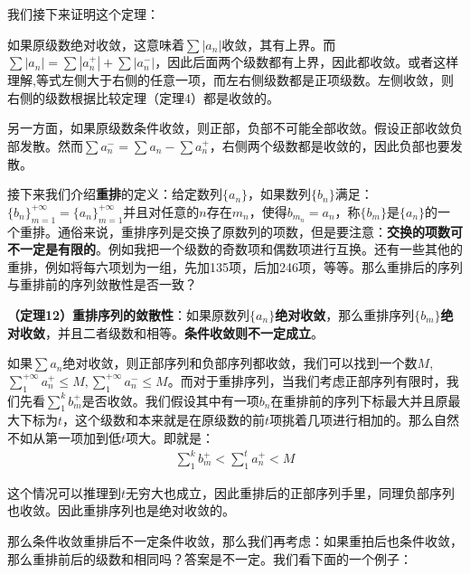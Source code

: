 \documentclass{ctexart}
\let\oldtextbf\textbf
\renewcommand{\textbf}[1]{\textcolor{brown!50!red}{\oldtextbf{#1}}}
\begin{document}
我们接下来证明这个定理：

如果原级数绝对收敛，这意味着$\sum |a_n|$收敛，其有上界。而$\sum |a_n|=\sum |a_n^+|+\sum|a_n^-|$，因此后面两个级数都有上界，因此都收敛。或者这样理解,等式左侧大于右侧的任意一项，而左右侧级数都是正项级数。左侧收敛，则右侧的级数根据比较定理（定理4）都是收敛的。

另一方面，如果原级数条件收敛，则正部，负部不可能全部收敛。假设正部收敛负部发散。然而$\sum a_n^-=\sum a_n-\sum a_n^+$，右侧两个级数都是收敛的，因此负部也要发散。

接下来我们介绍\textbf{\color{brown!50!red}重排}的定义：给定数列$\{a_n\}$，如果数列$\{b_n\}$满足：$\{ b_n\}_{m=1}^{+\infty}=\{a_n\}_{m=1}^{+\infty}$并且对任意的$n$存在$m_n$，使得$b_{m_n}=a_n$，称$\{b_m\}$是$\{a_n\}$的一个重排。通俗来说，重排序列是交换了原数列的项数，但是要注意：\textbf{\color{brown!50!red}交换的项数可不一定是有限的}。例如我把一个级数的奇数项和偶数项进行互换。还有一些其他的重排，例如将每六项划为一组，先加135项，后加246项，等等。那么重排后的序列与重排前的序列敛散性是否一致？
\begin{tcolorbox}[
    colback=bac2,     %
    colframe=fra2,   %
    coltitle=white,             %
    coltext=tex2,
    title=重排序列的敛散性,
    fonttitle=\bfseries,        %
arc=3mm,                     %
breakable
]
\textbf{\color{brown!50!red}（定理12）重排序列的敛散性}：如果原数列$\{a_n\}$\textbf{\color{brown!50!red}绝对收敛}，那么重排序列$\{b_m\}$\textbf{\color{brown!50!red}绝对收敛}，并且二者级数和相等。\textbf{\color{brown!50!red}条件收敛则不一定成立}。
\end{tcolorbox}

如果$\sum a_n$绝对收敛，则正部序列和负部序列都收敛，我们可以找到一个数$M$,$\sum_1^{+\infty} a_n^+\leq M,\sum_1^{+\infty} a_n^-\leq M$。而对于重排序列，当我们考虑正部序列有限时，我们先看$\sum_1^k b_m^+$是否收敛。我们假设其中有一项$b_n$在重排前的序列下标最大并且原最大下标为$t$，这个级数和本来就是在原级数的前$t$项挑着几项进行相加的。那么自然不如从第一项加到低$t$项大。即就是：
\begin{align*}
    \sum_1^k b_m^+ <\sum_1^t a_n^+<M
\end{align*}

这个情况可以推理到$t$无穷大也成立，因此重排后的正部序列手里，同理负部序列也收敛。因此重排序列也是绝对收敛的。

那么条件收敛重排后不一定条件收敛，那么我们再考虑：如果重拍后也条件收敛，那么重排前后的级数和相同吗？答案是\colorbox{pink!30!white}不一定。我们看下面的一个例子：
\end{document}
